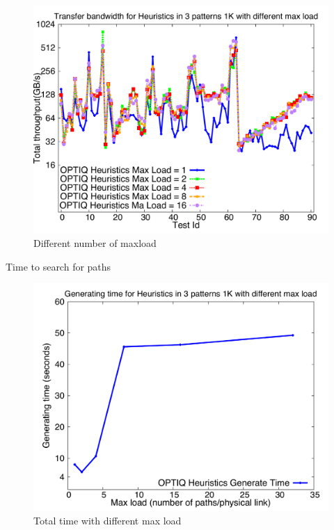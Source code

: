 \begin{figure}[!htb]
\vspace{-0.1in}
\centering
\includegraphics[scale=0.30]{figures/heu_paths.pdf}
\vspace{-0.1in}
\caption{Different number of maxload}
\vspace{-0.1in}
\label{fig:heu_paths}
\end{figure}

Time to search for paths

\begin{figure}[!htb]
\vspace{-0.1in}
\centering
\includegraphics[scale=0.30]{figures/heu_time.pdf}
\vspace{-0.1in}
\caption{Total time with different max load}
\vspace{-0.1in}
\label{fig:heu_time}
\end{figure}

